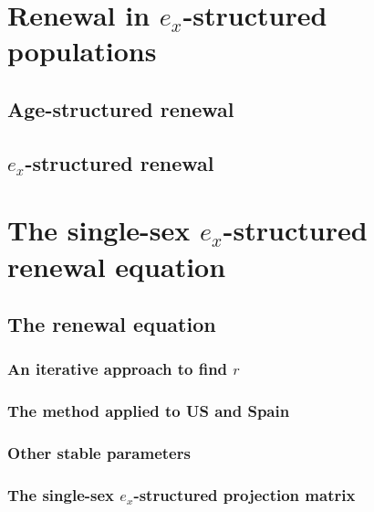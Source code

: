 \chapter{Renewal in $e_x$-structured populations}
  
    
    \section{Age-structured renewal}
      
    
    \section{$e_x$-structured renewal}
      
    
\chapter{The single-sex $e_x$-structured renewal equation}
    
    \section{The renewal equation}
      
      
      \subsection{An iterative approach to find $r$}
        
    
      \subsection{The method applied to US and Spain}
        
        
      \subsection{Other stable parameters}
        
      
      \subsection{The single-sex $e_x$-structured projection matrix}
        

